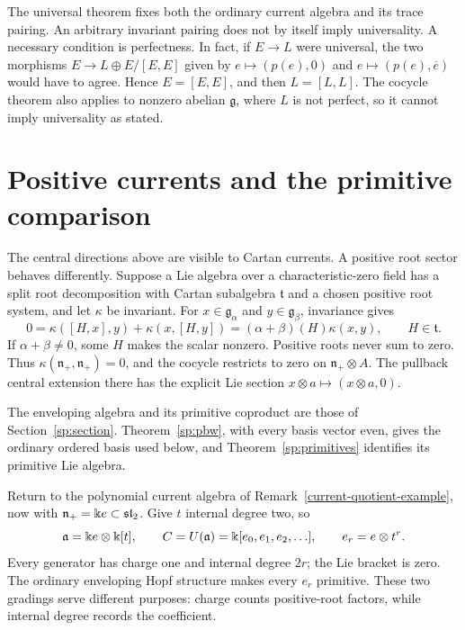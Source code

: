 \begin{remark}
The universal theorem fixes both the ordinary current algebra and its
trace pairing.  An arbitrary invariant pairing does not by itself
imply universality.  A necessary condition is perfectness.  In fact, if $E\to L$ were
universal, the two morphisms
$E\to L\oplus E/[E,E]$ given by $e\mapsto(p(e),0)$ and
$e\mapsto(p(e),\overline e)$ would have to agree.  Hence $E=[E,E]$,
and then $L=[L,L]$.  The cocycle theorem also applies to nonzero abelian
$\mathfrak g$, where $L$ is not perfect, so it cannot imply universality
as stated.

\end{remark}

\section{Positive currents and the primitive comparison}
\label{ce:positive}

The central directions above are visible to Cartan currents.  A positive
root sector behaves differently.  Suppose a Lie algebra over a
characteristic-zero field has a split root decomposition with Cartan
subalgebra $\mathfrak t$ and a chosen positive root system, and let
$\kappa$ be invariant.  For $x\in\mathfrak g_\alpha$ and
$y\in\mathfrak g_\beta$, invariance gives
\[
 0=\kappa([H,x],y)+\kappa(x,[H,y])
   =(\alpha+\beta)(H)\kappa(x,y),\qquad H\in\mathfrak t.
\]
If $\alpha+\beta\ne0$, some $H$ makes the scalar nonzero.
Positive roots never sum to zero.  Thus
$\kappa(\mathfrak n_+,\mathfrak n_+)=0$, and the cocycle restricts to
zero on $\mathfrak n_+\otimes A$.  The pullback central extension there
has the explicit Lie section $x\otimes a\mapsto(x\otimes a,0)$.

The enveloping algebra and its primitive coproduct are those of
Section~\ref{sp:section}. Theorem~\ref{sp:pbw}, with every basis vector
even, gives the ordinary ordered basis used below, and
Theorem~\ref{sp:primitives} identifies its primitive Lie algebra.

Return to the polynomial current algebra of
Remark~\ref{current-quotient-example}, now with
$\mathfrak n_+=\Bbbk e\subset\mathfrak{sl}_2$.
Give $t$ internal degree two, so
\[
 \mathfrak a=\Bbbk e\otimes \Bbbk[t],\qquad
 C=U(\mathfrak a)=\Bbbk[e_0,e_1,e_2,\ldots],\qquad e_r=e\otimes t^r.
\]
Every generator has charge one and internal degree $2r$; the Lie bracket
is zero.  The ordinary enveloping Hopf structure makes every $e_r$
primitive.  These two gradings serve different purposes: charge counts
positive-root factors, while internal degree records the coefficient.

